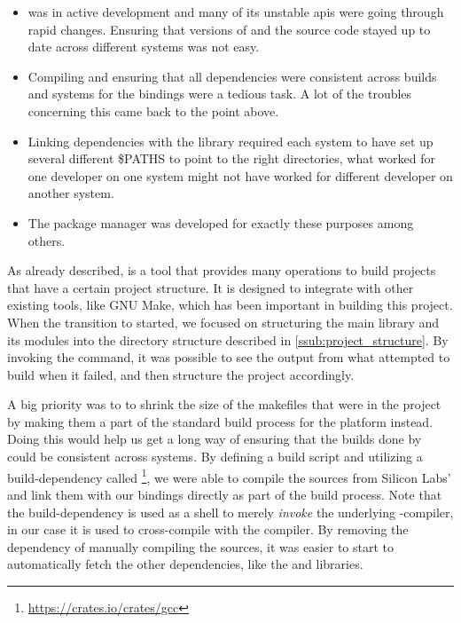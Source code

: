 \begin{itemize}
    \item {\rust} was in active development and many of its unstable \glspl{api} were going through rapid changes.
    Ensuring that versions of {\rustc} and the {\rust} source code stayed up to date across different systems was not easy.
    \item Compiling and ensuring that all dependencies were consistent across builds and systems for the bindings were a tedious task.
    A lot of the troubles concerning this came back to the point above.
    \item Linking dependencies with the library required each system to have set up several different \$PATHS to point to the right directories, what worked for one developer on one system might not have worked for different developer on another system.
    \item The {\cargo} package manager was developed for exactly these purposes among others.
\end{itemize}

As already described, {\cargo} is a tool that provides many operations to build {\rust} projects that have a certain project structure.
It is designed to integrate with other existing tools, like GNU Make, which has been important in building this project.
When the transition to {\cargo} started, we focused on structuring the main library and its modules into the directory structure described in \autoref{ssub:project_structure}.
By invoking the  command, it was possible to see the output from what {\cargo} attempted to build when it failed, and then structure the project accordingly.

A big priority was to to shrink the size of the makefiles that were in the project by making them a part of the standard build process for the {\rg} platform instead.
Doing this would help us get a long way of ensuring that the builds done by {\cargo} could be consistent across systems.
By defining a {\rust} build script and utilizing a {\rust} build-dependency called \footnote{\url{https://crates.io/crates/gcc}}, we were able to compile the {\C} sources from Silicon Labs' {\emlib} and link them with our bindings directly as part of the build process.
Note that the  build-dependency is used as a shell to merely \emph{invoke} the underlying {\C}-compiler, in our case it is used to cross-compile with the {\armgcc} compiler.
By removing the dependency of manually compiling the {\C} sources, it was easier to start to automatically fetch the other dependencies, like the {\core} and  libraries.

